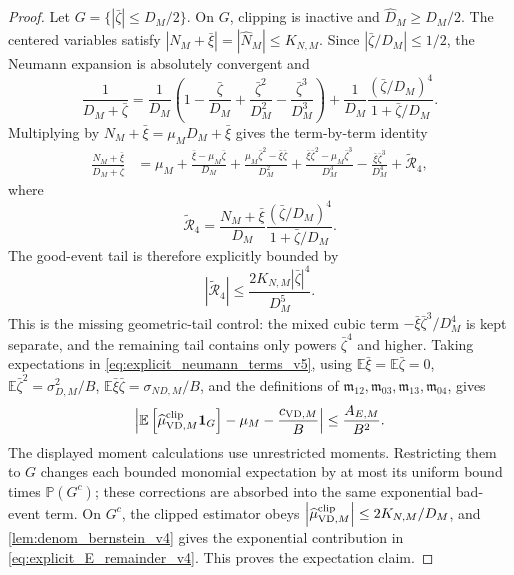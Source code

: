 \documentclass[11pt]{article}
\newcommand{\E}{\mathbb{E}}
\newcommand{\Prob}{\mathbb{P}}
\newcommand{\1}{\mathbf{1}}
\newcommand{\abs}[1]{\left\lvert #1 \right\rvert}
\begin{document}
\begin{proof}
Let \(G=\{\abs{\bar\zeta}\le D_M/2\}\).  On \(G\), clipping is inactive and \(\widehat D_M\ge D_M/2\).  The centered variables satisfy \(\abs{N_M+\bar\xi}=\abs{\widehat N_M}\le K_{N,M}\).  Since \(\abs{\bar\zeta/D_M}\le1/2\), the Neumann expansion is absolutely convergent and
\begin{equation}
    \frac{1}{D_M+\bar\zeta}
    =\frac1{D_M}\left(1-\frac{\bar\zeta}{D_M}
    +\frac{\bar\zeta^2}{D_M^2}-\frac{\bar\zeta^3}{D_M^3}\right)
    +\frac1{D_M}\frac{(\bar\zeta/D_M)^4}{1+\bar\zeta/D_M}.
\end{equation}
Multiplying by \(N_M+\bar\xi=\mu_MD_M+\bar\xi\) gives the term-by-term identity
\begin{align}
    \frac{N_M+\bar\xi}{D_M+\bar\zeta}
    &=\mu_M+\frac{\bar\xi-\mu_M\bar\zeta}{D_M}
      +\frac{\mu_M\bar\zeta^2-\bar\xi\bar\zeta}{D_M^2}
      +\frac{\bar\xi\bar\zeta^2-\mu_M\bar\zeta^3}{D_M^3}
      -\frac{\bar\xi\bar\zeta^3}{D_M^4}
      +\widetilde{\mathcal R}_4,
      \label{eq:explicit_neumann_terms_v5}
\end{align}
where
\begin{equation}
    \widetilde{\mathcal R}_4
    =\frac{N_M+\bar\xi}{D_M}\frac{(\bar\zeta/D_M)^4}{1+\bar\zeta/D_M}.
\end{equation}
The good-event tail is therefore explicitly bounded by
\begin{equation}
    \abs{\widetilde{\mathcal R}_4}
    \le \frac{2K_{N,M}\abs{\bar\zeta}^4}{D_M^5}.
    \label{eq:r4_tail_bound_v5}
\end{equation}
This is the missing geometric-tail control: the mixed cubic term \(-\bar\xi\bar\zeta^3/D_M^4\) is kept separate, and the remaining tail contains only powers \(\bar\zeta^4\) and higher.  Taking expectations in \cref{eq:explicit_neumann_terms_v5}, using \(\E\bar\xi=\E\bar\zeta=0\), \(\E\bar\zeta^2=\sigma_{D,M}^2/B\), \(\E\bar\xi\bar\zeta=\sigma_{ND,M}/B\), and the definitions of \(\mathfrak m_{12},\mathfrak m_{03},\mathfrak m_{13},\mathfrak m_{04}\), gives
\begin{equation}
    \left|\E\left[\widehat\mu^{\rm clip}_{\mathrm{VD},M}\mathbf 1_G\right]
    -\mu_M-\frac{c_{\mathrm{VD},M}}{B}\right|
    \le \frac{A_{E,M}}{B^2}.
\end{equation}
The displayed moment calculations use unrestricted moments.  Restricting them to \(G\) changes each bounded monomial expectation by at most its uniform bound times \(\Prob(G^c)\); these corrections are absorbed into the same exponential bad-event term.  On \(G^c\), the clipped estimator obeys \(\abs{\widehat\mu^{\rm clip}_{\mathrm{VD},M}}\le 2K_{N,M}/D_M\), and \cref{lem:denom_bernstein_v4} gives the exponential contribution in \cref{eq:explicit_E_remainder_v4}.  This proves the expectation claim.


\end{proof}
\end{document}
